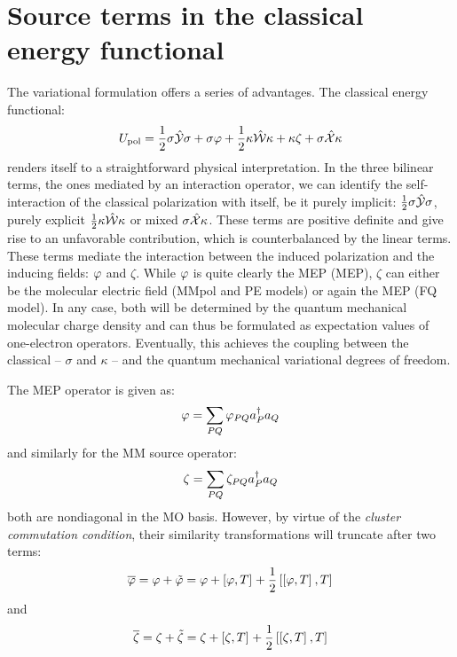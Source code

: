 \section{Source terms in the classical energy functional}

The variational formulation offers a series of advantages.
The classical energy functional:
\begin{equation}
  U_\mathrm{pol} =
   \frac{1}{2}\sigma\hat{\mathcal{Y}}\sigma + \sigma\varphi
 + \frac{1}{2}\kappa\hat{\mathcal{W}}\kappa + \kappa\zeta
 + \sigma\hat{\mathcal{X}}\kappa
\end{equation}
renders itself to a straightforward physical interpretation. In the
three bilinear terms, \ie{} the ones mediated by an interaction
operator, we can identify the self-interaction of the classical
polarization with itself, be it purely implicit:
$\frac{1}{2}\sigma\hat{\mathcal{Y}}\sigma$, purely explicit
$\frac{1}{2}\kappa\hat{\mathcal{W}}\kappa$ or mixed $\sigma\hat{\mathcal{X}}\kappa$.
These terms are positive definite and give rise to an unfavorable
contribution, which is counterbalanced by the linear terms. These terms
mediate the interaction between the induced polarization and the
inducing fields: $\varphi$ and $\zeta$. While $\varphi$ is quite clearly the
\acl{MEP} (\acs{MEP}), $\zeta$ can either be the molecular electric
field (MMpol and PE models) or again the \acs{MEP} (FQ model).
In any case, both will be determined by the quantum mechanical molecular
charge density and can thus be formulated as expectation values of
one-electron operators. Eventually, this achieves the coupling between
the classical -- $\sigma$ and $\kappa$ -- and
the quantum mechanical variational degrees of freedom.

The \acs{MEP} operator is given as:
\begin{equation}
  \varphi = \sum_{PQ}\varphi_{PQ}a_{P}^{\dagger}a_{Q}
\end{equation}
and similarly for the \acs{MM} source operator:
\begin{equation}
  \zeta = \sum_{PQ}\zeta_{PQ}a_{P}^{\dagger}a_{Q}
\end{equation}
both are nondiagonal in the MO basis. However,
by virtue of the \emph{cluster commutation condition}, their similarity
transformations will truncate after two
terms:\autocite{Helgaker2000-tz}
\begin{equation}
  \overline{\varphi} = \varphi + \tilde{\varphi}  = \varphi + \left[ \varphi, T \right]^{} +
  \frac{1}{2}\left[ \left[ \varphi, T \right]^{}, T \right]^{}
\end{equation}
and
\begin{equation}
  \overline{\zeta} = \zeta + \tilde{\zeta}  = \zeta + \left[ \zeta, T \right]^{} +
  \frac{1}{2}\left[ \left[ \zeta, T \right]^{}, T \right]^{}
\end{equation}

